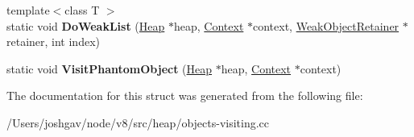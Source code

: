 \begin{DoxyCompactItemize}
\item 
{\footnotesize template$<$class T $>$ }\\static void {\bfseries Do\+Weak\+List} (\hyperlink{classv8_1_1internal_1_1_heap}{Heap} $\ast$heap, \hyperlink{classv8_1_1internal_1_1_context}{Context} $\ast$context, \hyperlink{classv8_1_1internal_1_1_weak_object_retainer}{Weak\+Object\+Retainer} $\ast$retainer, int index)\hypertarget{structv8_1_1internal_1_1_weak_list_visitor_3_01_context_01_4_aeb86daba518927eb207f5fad3337bda4}{}\label{structv8_1_1internal_1_1_weak_list_visitor_3_01_context_01_4_aeb86daba518927eb207f5fad3337bda4}

\item 
static void {\bfseries Visit\+Phantom\+Object} (\hyperlink{classv8_1_1internal_1_1_heap}{Heap} $\ast$heap, \hyperlink{classv8_1_1internal_1_1_context}{Context} $\ast$context)\hypertarget{structv8_1_1internal_1_1_weak_list_visitor_3_01_context_01_4_a939142c9460a8aa4f6cb9874b69b768a}{}\label{structv8_1_1internal_1_1_weak_list_visitor_3_01_context_01_4_a939142c9460a8aa4f6cb9874b69b768a}

\end{DoxyCompactItemize}


The documentation for this struct was generated from the following file\+:\begin{DoxyCompactItemize}
\item 
/\+Users/joshgav/node/v8/src/heap/objects-\/visiting.\+cc\end{DoxyCompactItemize}
